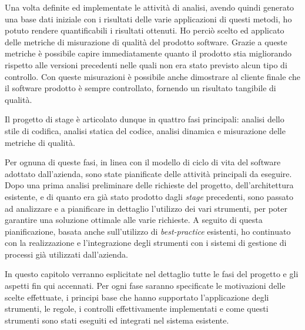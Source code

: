 Una volta definite ed implementate le attività di analisi, avendo quindi generato una base dati iniziale con i risultati delle varie applicazioni di questi metodi, ho potuto rendere quantificabili i risultati ottenuti. Ho perciò scelto ed applicato delle metriche di misurazione di qualità del prodotto software. Grazie a queste metriche è possibile capire immediatamente quanto il prodotto stia migliorando rispetto alle versioni precedenti nelle quali non era stato previsto alcun tipo di controllo. Con queste misurazioni è possibile anche dimostrare al cliente finale che il software prodotto è sempre controllato, fornendo un risultato tangibile di qualità.


Il progetto di stage è articolato dunque in quattro fasi principali: analisi dello stile di codifica, analisi statica del codice, analisi dinamica e misurazione delle metriche di qualità. 

Per ognuna di queste fasi, in linea con il modello di ciclo di vita del software adottato dall'azienda, sono state pianificate delle attività principali da eseguire. Dopo una prima analisi preliminare delle richieste del progetto, dell'architettura esistente, e di quanto era già stato prodotto dagli \textit{stage} precedenti, sono passato ad analizzare e a pianificare in dettaglio l'utilizzo dei vari strumenti, per poter garantire una soluzione ottimale alle varie richieste. A seguito di questa pianificazione, basata anche sull'utilizzo di \textit{best-practice} esistenti, ho continuato con la realizzazione e l'integrazione degli strumenti con i sistemi di gestione di processi già utilizzati dall'azienda.

In questo capitolo verranno esplicitate nel dettaglio tutte le fasi del progetto e gli aspetti fin qui accennati. Per ogni fase saranno specificate le motivazioni delle scelte effettuate, i principi base che hanno supportato l'applicazione degli strumenti, le regole, i controlli effettivamente implementati e come questi strumenti sono stati eseguiti ed integrati nel sistema esistente.



%




